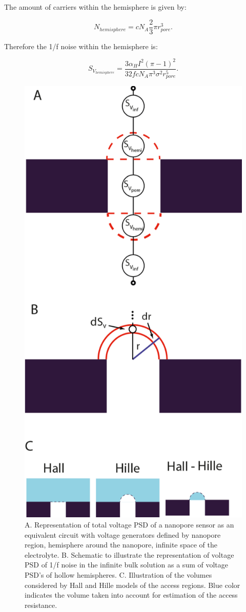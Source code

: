\noindent The amount of carriers within the hemisphere is given by:

\begin{equation}\label{eqn:Eq2.40}
N_{hemisphere}=cN_A\frac{2}{3}\pi r_{pore}^3 .
\end{equation}   


\noindent Therefore the 1/f noise within the hemisphere is:

\begin{equation}\label{eqn:Eq2.41}
S_{V_{hemisphere}}=\frac{3\alpha_HI^2(\pi-1)^2}{32fcN_A\pi^3\sigma^2r_{pore}^5}.
\end{equation} 





\begin{figure}[!htb]
	\centering
	\includegraphics[width=0.5\linewidth]{figures/Figure2.9.png}
	\caption{A. Representation of total voltage PSD of a nanopore sensor as an equivalent circuit with voltage generators defined by nanopore region, hemisphere around the nanopore, infinite space of the electrolyte. B. Schematic to illustrate the representation of voltage PSD of 1/f noise in the infinite bulk solution as a sum of voltage PSD’s of hollow hemispheres. C. Illustration of the volumes considered by Hall and Hille models of the access regions. Blue color indicates the volume taken into account for estimation of the access resistance.}
	\label{fig:fig.2.9}
\end{figure}


